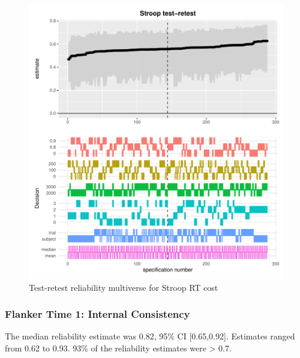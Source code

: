 \documentclass[
  english,
  man,floatsintext]{apa6}
\begin{document}
\begin{figure}
\centering
\includegraphics{Reliability_Multiverse_files/figure-latex/unnamed-chunk-7-1.pdf}
\caption{\label{fig:unnamed-chunk-7}Test-retest reliability multiverse for Stroop RT cost}
\end{figure}

\newpage

\hypertarget{flanker-time-1-internal-consistency}{%
\subsubsection{Flanker Time 1: Internal Consistency}\label{flanker-time-1-internal-consistency}}

The median reliability estimate was 0.82, 95\% CI {[}0.65,0.92{]}. Estimates ranged from 0.62 to 0.93. 93\% of the reliability estimates were \textgreater{} 0.7.
\end{document}
